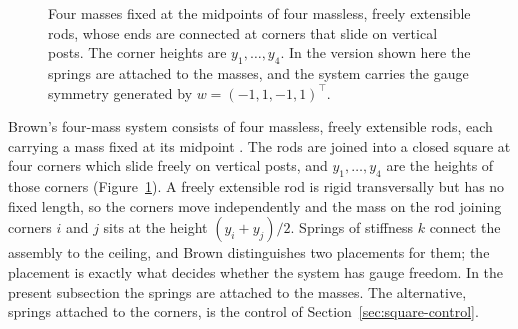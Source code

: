 \documentclass[12pt]{article}
\theoremstyle{plain}
\theoremstyle{definition}
\theoremstyle{remark}
\begin{document}
\begin{figure}[ht]
		\caption{Four masses fixed at the midpoints of four massless, freely
			extensible rods, whose ends are connected at corners that slide on vertical
			posts. The corner heights are $y_{1},\dots,y_{4}$. In the version shown here
			the springs are attached to the masses, and the system carries the gauge
			symmetry generated by $w=(-1,1,-1,1)^{\top}$.}
		\label{fig:brown_4masses}
	\end{figure}
	
	Brown's four-mass system consists of four massless, freely extensible rods, each
	carrying a mass fixed at its midpoint \cite{Brown2023}. The rods are joined into
	a closed square at four corners which slide freely on vertical posts, and
	$y_{1},\dots,y_{4}$ are the heights of those corners
	(Figure~\ref{fig:brown_4masses}). A freely extensible rod is rigid transversally
	but has no fixed length, so the corners move independently and the mass on the
	rod joining corners $i$ and $j$ sits at the height $(y_{i}+y_{j})/2$. Springs of
	stiffness $k$ connect the assembly to the ceiling, and Brown distinguishes two
	placements for them; the placement is exactly what decides whether the system
	has gauge freedom. In the present subsection the springs are attached to the
	masses. The alternative, springs attached to the corners, is the control of
	Section~\ref{sec:square-control}.
	
\end{document}
